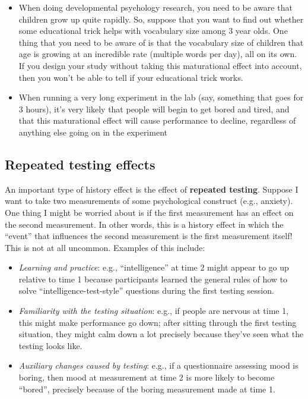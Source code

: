 \documentclass[
]{book}
\begin{document}
\begin{itemize}
\item
  When doing developmental psychology research, you need to be aware that children grow up quite rapidly. So, suppose that you want to find out whether some educational trick helps with vocabulary size among 3 year olds. One thing that you need to be aware of is that the vocabulary size of children that age is growing at an incredible rate (multiple words per day), all on its own. If you design your study without taking this maturational effect into account, then you won't be able to tell if your educational trick works.
\item
  When running a very long experiment in the lab (say, something that goes for 3 hours), it's very likely that people will begin to get bored and tired, and that this maturational effect will cause performance to decline, regardless of anything else going on in the experiment
\end{itemize}

\hypertarget{repeated-testing-effects}{%
\subsection{Repeated testing effects}\label{repeated-testing-effects}}

An important type of history effect is the effect of \textbf{repeated testing}. Suppose I want to take two measurements of some psychological construct (e.g., anxiety). One thing I might be worried about is if the first measurement has an effect on the second measurement. In other words, this is a history effect in which the ``event'' that influences the second measurement is the first measurement itself! This is not at all uncommon. Examples of this include:

\begin{itemize}
\item
  {\emph{Learning and practice}}: e.g., ``intelligence'' at time 2 might appear to go up relative to time 1 because participants learned the general rules of how to solve ``intelligence-test-style'' questions during the first testing session.
\item
  {\emph{Familiarity with the testing situation}}: e.g., if people are nervous at time 1, this might make performance go down; after sitting through the first testing situation, they might calm down a lot precisely because they've seen what the testing looks like.
\item
  {\emph{Auxiliary changes caused by testing}}: e.g., if a questionnaire assessing mood is boring, then mood at measurement at time 2 is more likely to become ``bored'', precisely because of the boring measurement made at time 1.
\end{itemize}
\end{document}
